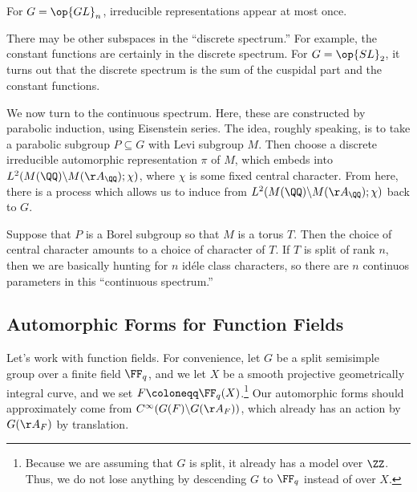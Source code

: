 \documentclass[../notes.tex]{subfiles}
\begin{document}
\begin{example}
	For $G=\op{GL}_n$, irreducible representations appear at most once.
\end{example}
\begin{remark}
	There may be other subspaces in the ``discrete spectrum.'' For example, the constant functions are certainly in the discrete spectrum. For $G=\op{SL}_2$, it turns out that the discrete spectrum is the sum of the cuspidal part and the constant functions.
\end{remark}
We now turn to the continuous spectrum. Here, these are constructed by parabolic induction, using Eisenstein series. The idea, roughly speaking, is to take a parabolic subgroup $P\subseteq G$ with Levi subgroup $M$. Then choose a discrete irreducible automorphic representation $\pi$ of $M$, which embeds into $L^2(M(\QQ)\backslash M(\AA_\QQ);\chi)$, where $\chi$ is some fixed central character. From here, there is a process which allows us to induce from $L^2(M(\QQ)\backslash M(\AA_\QQ);\chi)$ back to $G$.
\begin{example}
	Suppose that $P$ is a Borel subgroup so that $M$ is a torus $T$. Then the choice of central character amounts to a choice of character of $T$. If $T$ is split of rank $n$, then we are basically hunting for $n$ id\'ele class characters, so there are $n$ continuos parameters in this ``continuous spectrum.''
\end{example}

\subsection{Automorphic Forms for Function Fields}
Let's work with function fields. For convenience, let $G$ be a split semisimple group over a finite field $\FF_q$, and we let $X$ be a smooth projective geometrically integral curve, and we set $F\coloneqq\FF_q(X)$.\footnote{Because we are assuming that $G$ is split, it already has a model over $\ZZ$. Thus, we do not lose anything by descending $G$ to $\FF_q$ instead of over $X$.} Our automorphic forms should approximately come from $C^\infty(G(F)\backslash G(\AA_F))$, which already has an action by $G(\AA_F)$ by translation.
\end{document}
